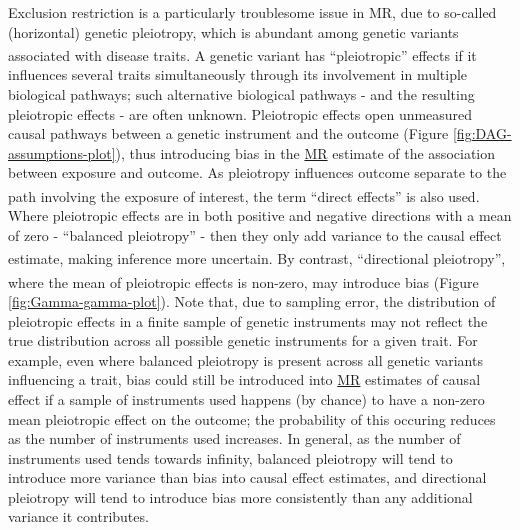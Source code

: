 \documentclass[
]{article}
\begin{document}
Exclusion restriction is a particularly troublesome issue in MR, due to so-called (horizontal) genetic pleiotropy, which is abundant among genetic variants associated with disease traits\textsuperscript{}. A genetic variant has ``pleiotropic'' effects if it influences several traits simultaneously through its involvement in multiple biological pathways; such alternative biological pathways - and the resulting pleiotropic effects - are often unknown. Pleiotropic effects open unmeasured causal pathways between a genetic instrument and the outcome (Figure \ref{fig:DAG-assumptions-plot}), thus introducing bias in the \hyperref[acronyms_MR]{MR} estimate of the association between exposure and outcome. As pleiotropy influences outcome separate to the path involving the exposure of interest, the term ``direct effects'' is also used\textsuperscript{}. Where pleiotropic effects are in both positive and negative directions with a mean of zero - ``balanced pleiotropy'' - then they only add variance to the causal effect estimate, making inference more uncertain\textsuperscript{}. By contrast, ``directional pleiotropy'', where the mean of pleiotropic effects is non-zero, may introduce bias\textsuperscript{} (Figure \ref{fig:Gamma-gamma-plot}). Note that, due to sampling error, the distribution of pleiotropic effects in a finite sample of genetic instruments may not reflect the true distribution across all possible genetic instruments for a given trait. For example, even where balanced pleiotropy is present across all genetic variants influencing a trait, bias could still be introduced into \hyperref[acronyms_MR]{MR} estimates of causal effect if a sample of instruments used happens (by chance) to have a non-zero mean pleiotropic effect on the outcome; the probability of this occuring reduces as the number of instruments used increases. In general, as the number of instruments used tends towards infinity, balanced pleiotropy will tend to introduce more variance than bias into causal effect estimates, and directional pleiotropy will tend to introduce bias more consistently than any additional variance it contributes.
\end{document}

